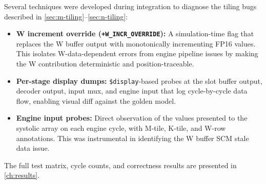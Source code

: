 Several techniques were developed during integration to diagnose the tiling bugs
described in \autoref{sec:m-tiling}--\autoref{sec:n-tiling}:

\begin{itemize}
    \item \textbf{W increment override (\texttt{+W\_INCR\_OVERRIDE}):} A
          simulation-time flag that replaces the W buffer output with
          monotonically incrementing FP16 values. This isolates W-data-dependent
          errors from engine pipeline issues by making the W contribution
          deterministic and position-traceable.
    \item \textbf{Per-stage display dumps:} \texttt{\$display}-based probes at
          the slot buffer output, decoder output, input mux, and engine input
          that log cycle-by-cycle data flow, enabling visual diff against the
          golden model.
    \item \textbf{Engine input probes:} Direct observation of the values
          presented to the systolic array on each engine cycle, with M-tile,
          K-tile, and W-row annotations. This was instrumental in identifying
          the W buffer SCM stale data issue.
\end{itemize}

The full test matrix, cycle counts, and correctness results are presented in
\autoref{ch:results}.
